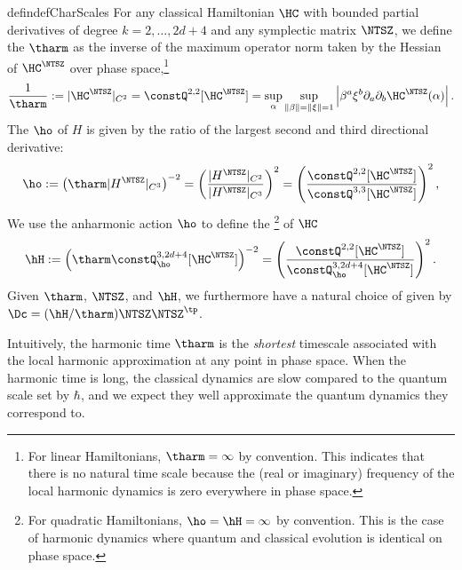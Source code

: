 \documentclass{article}
\numberwithin{equation}{section}
\begin{document}
\begin{restatable}{defin}{defCharScales}
    \label{def:characteristicScales}
    For any classical Hamiltonian $\HC$ with bounded partial derivatives of degree $k=2,\ldots,2d+4$
    and any symplectic matrix $\NTSZ$, we define the 
     $\tharm$ as the inverse of the maximum operator norm taken by the Hessian of $\HC^\NTSZ$ over phase space,\footnote{For linear Hamiltonians, $\tharm=\infty$ by convention. This indicates that there is no natural time scale because the (real or imaginary) frequency of the local harmonic dynamics is zero everywhere in phase space.} 
    \begin{align}
        \frac{1}{\tharm} := |\HC^\NTSZ|_{C^2} = \constQ^{2,2}[\HC^\NTSZ] 
        = \sup_\alpha \sup_{\|\beta\|=\|\xi\|=1} \left|\beta^{a}\xi^{b} \partial_{a}\partial_{b} \HC^\NTSZ(\alpha)\right|.
    \end{align} 
    The  $\ho$ of $H$ is given by the ratio of the largest second and third directional derivative:
    \begin{align}
     \ho := 
        \left(\tharm |H^\NTSZ|_{C^3}\right)^{-2} = 
        \left(\frac{|H^\NTSZ|_{C^2}}{|H^\NTSZ|_{C^3}}\right)^2  = 
        \left(\frac{\constQ^{2,2}[\HC^\NTSZ]}{\constQ^{3,3}[\HC^\NTSZ]}\right)^2,
    \end{align}
    We use the anharmonic action
    $\ho$ to define the \footnote{For quadratic Hamiltonians, $\ho = \hH = \infty$ by convention. This is the case of harmonic dynamics where quantum and classical evolution is identical on phase space.} of $\HC$
    \begin{align}
    \label{eq:char-action-def}
        \hH := 
        \left(\tharm \constQ^{3,2d+4}_{\ho}[\HC^\NTSZ]\right)^{-2} = 
        \left(\frac{\constQ^{2,2}[\HC^\NTSZ]}{\constQ^{3,2d+4}_{\ho}[\HC^\NTSZ]}\right)^2.
    \end{align}
    Given $\tharm$, $\NTSZ$, and $\hH$, we furthermore have a natural choice of  given by $\Dc = (\hH/\tharm)\NTSZ\NTSZ^\tp$.
\end{restatable}

Intuitively, the harmonic time $\tharm$ is the \emph{shortest} timescale associated with the local harmonic approximation at any point in phase space.
When the harmonic time is long, the classical dynamics are slow compared to the quantum scale set by $\hbar$, and we expect they well approximate the quantum dynamics they correspond to.
\end{document}
